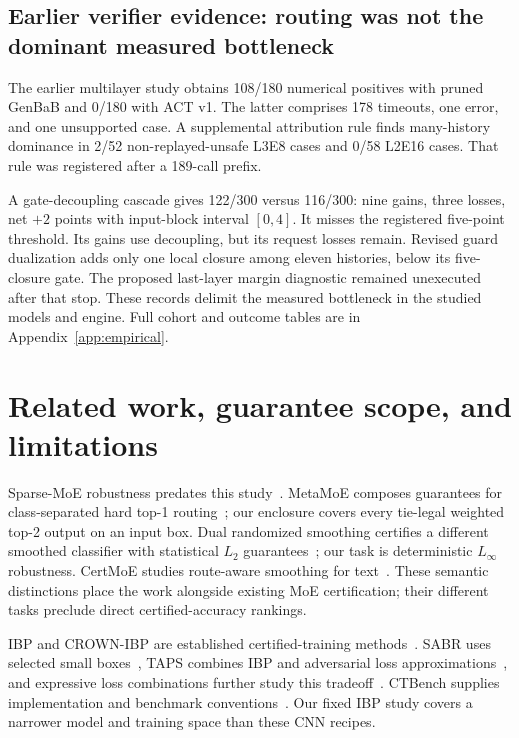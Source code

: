 \documentclass[10pt]{article}
\begin{document}
\subsection{Earlier verifier evidence: routing was not the dominant measured bottleneck}
The earlier multilayer study obtains 108/180 numerical positives with pruned
GenBaB and 0/180 with ACT v1. The latter comprises 178 timeouts, one error,
and one unsupported case. A supplemental attribution
rule finds many-history dominance in 2/52 non-replayed-unsafe L3E8 cases and
0/58 L2E16 cases. That rule was registered after a 189-call prefix.

A gate-decoupling cascade gives 122/300 versus 116/300: nine gains, three
losses, net $+2$ points with input-block interval $[0,4]$. It misses the
registered five-point threshold. Its gains use decoupling, but its request
losses remain. Revised guard dualization adds only one local closure among
eleven histories, below its five-closure gate. The proposed last-layer
margin diagnostic remained unexecuted after that stop. These records delimit
the measured bottleneck in the studied models and engine. Full cohort and outcome tables are in
Appendix~\ref{app:empirical}.

\section{Related work, guarantee scope, and limitations}
\label{sec:numericalscope}
Sparse-MoE robustness predates this study~\cite{robmoe,rter}.
MetaMoE composes guarantees for class-separated hard top-1 routing~\cite{metamoe};
our enclosure covers every tie-legal weighted top-2 output on an input box.
Dual randomized smoothing certifies a different smoothed classifier with
statistical $L_2$ guarantees~\cite{dualrs}; our task is deterministic
$L_\infty$ robustness. CertMoE studies route-aware smoothing for text~\cite{certmoe}.
These semantic distinctions place the work alongside existing MoE
certification; their different tasks preclude direct certified-accuracy rankings.

IBP and CROWN-IBP are established certified-training methods~\cite{ibp,crownibp}.
SABR uses selected small boxes~\cite{sabr}, TAPS combines IBP and adversarial
loss approximations~\cite{taps}, and expressive loss combinations further
study this tradeoff~\cite{mtlibp}. CTBench supplies implementation and benchmark
conventions~\cite{ctbench}. Our fixed IBP study covers a narrower model and
training space than these CNN recipes.
\end{document}

